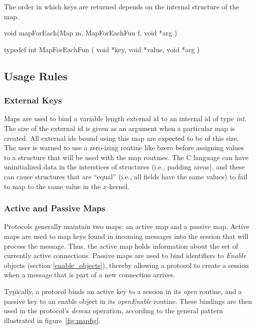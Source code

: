 The order in which keys are returned depends on the
internal structure of the map.

\medskip

{\sem void} {\bold mapForEach}({\sem Map} {\caps m}, {\sem MapForEachFun} {\caps f}, {\sem void} *{\caps arg} )
\medskip

{\sem typedef int} {\bold MapForEachFun}
(
{\sem void} *{\caps key}, 
{\sem void} *{\caps value}, 
{\sem void} *{\caps arg} 
)


\subsection{Usage Rules}

\subsubsection{External Keys}

Maps are used to bind a variable length external id to an internal id
of type {\em int}.  The size of the external id is given
as an argument when a particular map is created. All external ids
bound using this map are expected to be of this size.  The user is
warned to use a zero-izing routine like {\sanss bzero} before
assigning values to a structure that will be used with the map
routines.  The C language can have uninitialized data in the
interstices of structures (i.e., padding areas), and these can cause
structures that are ``equal'' (i.e., all fields have the same values)
to fail to map to the same value in the $x$-kernel.


\subsubsection{Active and Passive Maps}

Protocols generally maintain two maps: an active map and a passive
map.  Active maps are used to map keys found in incoming messages into
the session that will process the message. Thus, the active map holds
information about the set of currently active connections. Passive
maps are used to bind identifiers to {\em Enable} objects 
(section \ref{enable_objects}),
thereby allowing a
protocol to create a session when a message that is part of a new
connection arrives.

Typically, a protocol binds an active key to a session in its {\em
open} routine, and a passive key to an enable object in its {\em
openEnable} routine. These bindings are then used in the protocol's
{\em demux} operation, according to the general pattern illustrated in
figure~\ref{fig:mapfig}.


